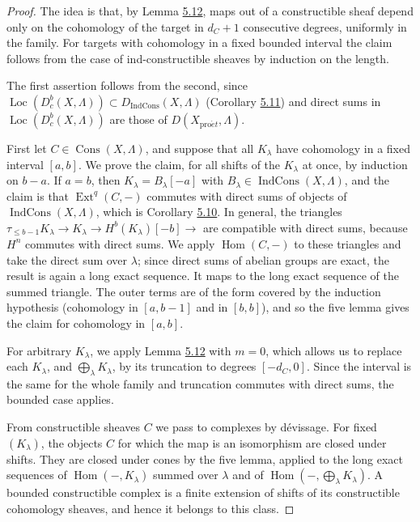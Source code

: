 \documentclass[11pt]{article}
\providecommand{\Cons}{}\renewcommand{\Cons}{\operatorname{Cons}}
\providecommand{\Dbc}{}\renewcommand{\Dbc}{D^b_c}
\providecommand{\Dic}{}\renewcommand{\Dic}{D_{\IndCons}}
\providecommand{\Ext}{}\renewcommand{\Ext}{\operatorname{Ext}}
\providecommand{\Hom}{}\renewcommand{\Hom}{\operatorname{Hom}}
\providecommand{\IndCons}{}\renewcommand{\IndCons}{\operatorname{IndCons}}
\providecommand{\Loc}{}\renewcommand{\Loc}{\operatorname{Loc}}
\begin{document}
\begin{proof}[{Proof}]\label{bp41}%
The idea is that, by Lemma \hyperref[bp37]{5.12}, maps out of a constructible sheaf depend only on the cohomology of the target in \(d_C+1\) consecutive degrees, uniformly in the family. For targets with cohomology in a fixed bounded interval the claim follows from the case of ind-constructible sheaves by induction on the length.

The first assertion follows from the second, since \(\Loc(\Dbc(X,\Lambda))\subset\Dic(X,\Lambda)\) (Corollary \hyperref[bp33]{5.11}) and direct sums in \(\Loc(\Dbc(X,\Lambda))\) are those of \(D(X_{\mathrm{pro}\acute{e}t},\Lambda)\).

First let \(C\in\Cons(X,\Lambda)\), and suppose that all \(K_\lambda\) have cohomology in a fixed interval \([a,b]\). We prove the claim, for all shifts of the \(K_\lambda\) at once, by induction on \(b-a\). If \(a=b\), then \(K_\lambda=B_\lambda[-a]\) with \(B_\lambda\in\IndCons(X,\Lambda)\), and the claim is that \(\Ext^q(C,-)\) commutes with direct sums of objects of \(\IndCons(X,\Lambda)\), which is Corollary \hyperref[bp30]{5.10}. In general, the triangles \(\tau_{\leq b-1}K_\lambda\to K_\lambda\to H^b(K_\lambda)[-b]\to\) are compatible with direct sums, because \(H^n\) commutes with direct sums. We apply \(\Hom(C,-)\) to these triangles and take the direct sum over \(\lambda\); since direct sums of abelian groups are exact, the result is again a long exact sequence. It maps to the long exact sequence of the summed triangle. The outer terms are of the form covered by the induction hypothesis (cohomology in \([a,b-1]\) and in \([b,b]\)), and so the five lemma gives the claim for cohomology in \([a,b]\).

For arbitrary \(K_\lambda\), we apply Lemma \hyperref[bp37]{5.12} with \(m=0\), which allows us to replace each \(K_\lambda\), and \(\bigoplus_\lambda K_\lambda\), by its truncation to degrees \([-d_C,0]\). Since the interval is the same for the whole family and truncation commutes with direct sums, the bounded case applies.

From constructible sheaves \(C\) we pass to complexes by dévissage. For fixed \((K_\lambda)\), the objects \(C\) for which the map is an isomorphism are closed under shifts. They are closed under cones by the five lemma, applied to the long exact sequences of \(\Hom(-,K_\lambda)\) summed over \(\lambda\) and of \(\Hom(-,\bigoplus_\lambda K_\lambda)\). A bounded constructible complex is a finite extension of shifts of its constructible cohomology sheaves, and hence it belongs to this class.
\end{proof}
\end{document}
